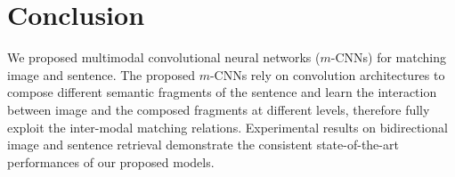 \documentclass[10pt,twocolumn,letterpaper]{article}
\begin{document}
\section{Conclusion}


We proposed multimodal convolutional neural networks ($m$-CNNs) for matching image and sentence. The proposed $m$-CNNs rely on convolution architectures to compose different semantic fragments of the sentence and learn the interaction between image and the composed fragments at different levels, therefore fully exploit the inter-modal matching relations. Experimental results on bidirectional image and sentence retrieval demonstrate the consistent state-of-the-art performances of our proposed models.


{\small


}
\end{document}
